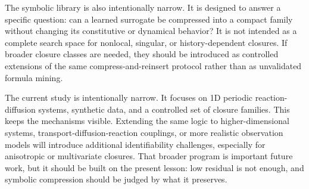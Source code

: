 The symbolic library is also intentionally narrow. It is designed to answer a specific question: can a learned surrogate be compressed into a compact family without changing its constitutive or dynamical behavior? It is not intended as a complete search space for nonlocal, singular, or history-dependent closures. If broader closure classes are needed, they should be introduced as controlled extensions of the same compress-and-reinsert protocol rather than as unvalidated formula mining.

The current study is intentionally narrow. It focuses on 1D periodic reaction-diffusion systems, synthetic data, and a controlled set of closure families. This keeps the mechanisms visible. Extending the same logic to higher-dimensional systems, transport-diffusion-reaction couplings, or more realistic observation models will introduce additional identifiability challenges, especially for anisotropic or multivariate closures. That broader program is important future work, but it should be built on the present lesson: low residual is not enough, and symbolic compression should be judged by what it preserves.

